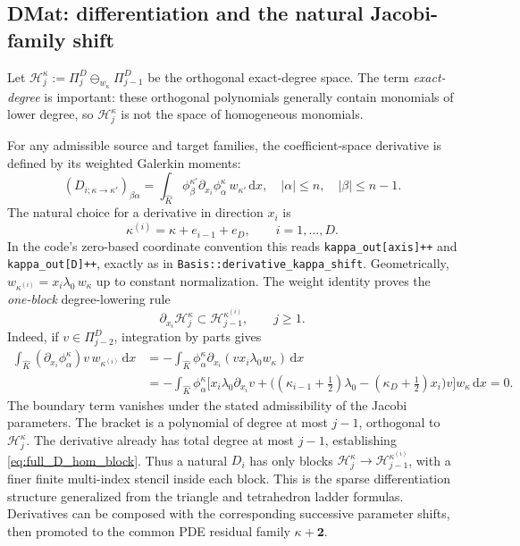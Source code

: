 \documentclass[11pt]{article}
\begin{document}
\subsection{DMat: differentiation and the natural Jacobi-family shift}
\label{sec:full_natural_shift}
Let
$\mathcal H_j^\kappa:=\Pi_j^D\ominus_{w_\kappa}\Pi_{j-1}^D$
be the orthogonal exact-degree space.  The term \emph{exact-degree}
is important: these orthogonal polynomials generally contain monomials
of lower degree, so $\mathcal H_j^\kappa$ is not the space of
homogeneous monomials.

For any admissible source and target families, the coefficient-space
derivative is defined by its weighted Galerkin moments:
\begin{equation}\label{eq:full_D_def}
 (D_{i;\kappa\to\kappa'})_{\beta\alpha}
 =\int_{\widehat K}\phi_\beta^{\kappa'}
    \partial_{x_i}\phi_\alpha^\kappa\,
       w_{\kappa'}\,\mathrm dx,
 \quad |\alpha|\le n,\quad |\beta|\le n-1.
\end{equation}
The natural choice for a derivative in direction $x_i$ is
\begin{equation}\label{eq:full_natural_deriv_shift}
 \boxed{\kappa^{(i)}=\kappa+e_{i-1}+e_D,
 \qquad i=1,\ldots,D.}
\end{equation}
In the code's zero-based coordinate convention this reads
\texttt{kappa\_out[axis]++} and \texttt{kappa\_out[D]++}, exactly as in
\texttt{Basis::derivative\_kappa\_shift}.  Geometrically,
$w_{\kappa^{(i)}}=x_i\lambda_0\,w_\kappa$ up to constant normalization.
The weight identity proves the \emph{one-block} degree-lowering rule
\begin{equation}\label{eq:full_D_hom_block}
 \partial_{x_i}\mathcal H_j^\kappa
 \subset \mathcal H_{j-1}^{\kappa^{(i)}},\qquad j\ge1.
\end{equation}
Indeed, if $v\in\Pi_{j-2}^D$, integration by parts gives
\begin{align}\label{eq:full_D_ibp}
 \int_{\widehat K}(\partial_{x_i}\phi_\alpha^\kappa)
  v\,w_{\kappa^{(i)}}\,\mathrm dx
 &=-\int_{\widehat K}\phi_\alpha^\kappa
   \partial_{x_i}(v x_i\lambda_0 w_\kappa)\,\mathrm dx\\
 &=-\int_{\widehat K}\phi_\alpha^\kappa
 \Big[x_i\lambda_0\partial_{x_i}v
   +\big((\kappa_{i-1}+\tfrac12)\lambda_0
        -(\kappa_D+\tfrac12)x_i\big)v\Big]
  w_\kappa\,\mathrm dx=0.\nonumber
\end{align}
The boundary term vanishes under the stated admissibility of the
Jacobi parameters.  The bracket is a polynomial of degree at most
$j-1$, orthogonal to $\mathcal H_j^\kappa$.  The derivative already
has total degree at most $j-1$, establishing
\eqref{eq:full_D_hom_block}.  Thus a natural $D_i$ has only blocks
$\mathcal H_j^\kappa\to\mathcal H_{j-1}^{\kappa^{(i)}}$,
with a finer finite multi-index stencil inside each block.  This is
the sparse differentiation structure generalized from the triangle
and tetrahedron ladder formulas.  Derivatives can be composed with
the corresponding successive parameter shifts, then promoted to the
common PDE residual family $\kappa+\bm2$.
\end{document}
